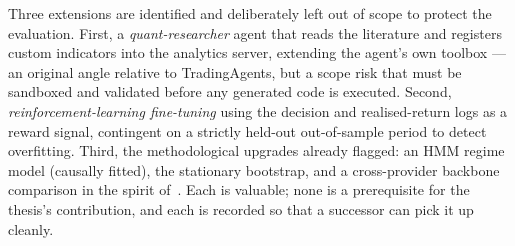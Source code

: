 Three extensions are identified and deliberately left out of scope to protect the evaluation.
First, a \emph{quant-researcher} agent that reads the literature and registers custom
indicators into the analytics server, extending the agent's own toolbox --- an original angle
relative to TradingAgents, but a scope risk that must be sandboxed and validated before any
generated code is executed. Second, \emph{reinforcement-learning fine-tuning} using the
decision and realised-return logs as a reward signal, contingent on a strictly held-out
out-of-sample period to detect overfitting. Third, the methodological upgrades already flagged:
an HMM regime model (causally fitted), the stationary bootstrap, and a cross-provider backbone
comparison in the spirit of~\cite{ama2025}. Each is valuable; none is a prerequisite for the
thesis's contribution, and each is recorded so that a successor can pick it up cleanly.
